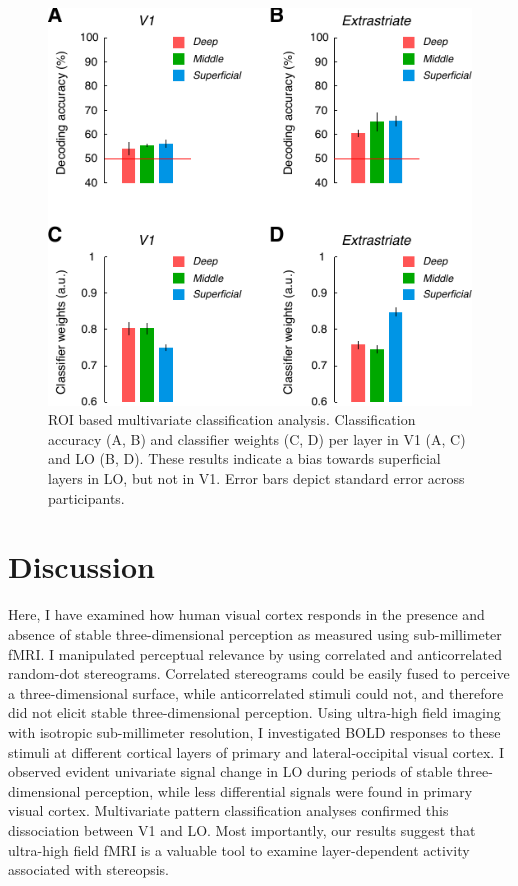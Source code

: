 \begin{figure}
  \centering
  \includegraphics[keepaspectratio]{Fig6}
  \caption[ROI based multivariate classification analysis.]{ROI based multivariate classification analysis. Classification accuracy (A, B) and classifier weights (C, D) per layer in V1 (A, C) and LO (B, D). These results indicate a bias towards superficial layers in LO, but not in V1. Error bars depict standard error across participants.}
  \label{fig:ch5fig6}
\end{figure}


\section{Discussion}

Here, I have examined how human visual cortex responds in the presence and absence of stable three-dimensional perception as measured using sub-millimeter fMRI. I manipulated perceptual relevance by using correlated and anticorrelated random-dot stereograms. Correlated stereograms could be easily fused to perceive a three-dimensional surface, while anticorrelated stimuli could not, and therefore did not elicit stable three-dimensional perception. Using ultra-high field imaging with isotropic sub-millimeter resolution, I investigated BOLD responses to these stimuli at different cortical layers of primary and lateral-occipital visual cortex. I observed evident univariate signal change in LO during periods of stable three-dimensional perception, while less differential signals were found in primary visual cortex. Multivariate pattern classification analyses confirmed this dissociation between V1 and LO. Most importantly, our results suggest that ultra-high field fMRI is a valuable tool to examine layer-dependent activity associated with stereopsis.


